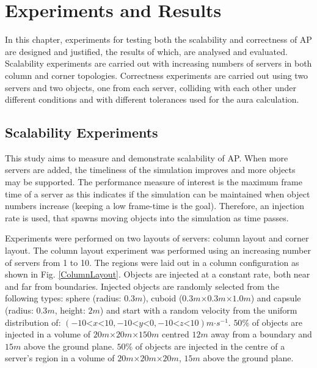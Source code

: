 \chapter{Experiments and Results}\label{Results}
In this chapter, experiments for testing both the scalability and correctness of AP are designed and justified, the results of which, are analysed and evaluated. Scalability experiments are carried out with increasing numbers of servers in both column and corner topologies. Correctness experiments are carried out using two servers and two objects, one from each server, colliding with each other under different conditions and with different tolerances used for the aura calculation.

\section{Scalability Experiments}
This study aims to measure and demonstrate scalability of AP. When more servers are added, the timeliness of the simulation improves and more objects may be supported. The performance measure of interest is the maximum frame time of a server as this indicates if the simulation can be maintained when object numbers increase (keeping a low frame-time is the goal). Therefore, an injection rate is used, that spawns moving objects into the simulation as time passes.

Experiments were performed on two layouts of servers: column layout and corner layout. The column layout experiment was performed using an increasing number of servers from 1 to 10. The regions were laid out in a column configuration as shown in Fig. \ref{ColumnLayout}. Objects are injected at a constant rate, both near and far from boundaries. Injected objects are randomly selected from the following types: sphere (radius: $0.3m$), cuboid ($0.3m\mathord{\times}0.3m\mathord{\times}1.0m$) and capsule (radius: $0.3m$, height: $2m$) and start with a random velocity from the uniform distribution of: $(-10\mathord{<}x\mathord{<}10,-10\mathord{<}y\mathord{<}0,-10\mathord{<}z\mathord{<}10)m\mathord{\cdot}s^{-1}$. $50\%$ of objects are injected in a volume of $20m\mathord{\times}20m\mathord{\times}150m$ centred $12m$ away from a boundary and $15m$ above the ground plane. $50\%$ of objects are injected in the centre of a server's region in a volume of $20m\mathord{\times}20m\mathord{\times}20m$, $15m$ above the ground plane.

